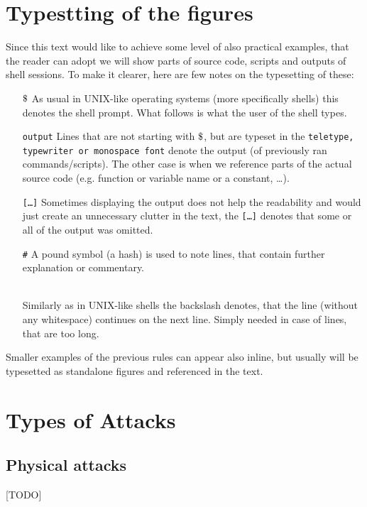\documentclass[a4paper]{scrartcl}
\newcommand{\dollar}{\mbox{\textdollar}}
\begin{document}
\section{Typestting of the figures}

Since this text would like to achieve some level of also practical examples, that the reader can adopt we will show parts of source code, scripts and outputs of shell sessions. To make it clearer, here are few notes on the typesetting of these:
\begin{itemize}
    \item[\texttt{$\dollar$}] As usual in UNIX-like operating systems (more specifically shells) this denotes the shell prompt. What follows is what the user of the shell types.
    \item[\texttt{output}] Lines that are not starting with \texttt{$\dollar$}, but are typeset in the \texttt{teletype, typewriter or monospace font} denote the output (of previously ran commands/scripts). The other case is when we reference parts of the actual source code (e.g. function or variable name or a constant, \ldots).
    \item[\texttt{[\ldots]}] Sometimes displaying the output does not help the readability and would just create an unnecessary clutter in the text, the \texttt{[\ldots]} denotes that some or all of the output was omitted.
    \item[\texttt{\#}] A pound symbol (a hash) is used to note lines, that contain further explanation or commentary.
    \item[\texttt{\\}] Similarly as in UNIX-like shells the backslash denotes, that the line (without any whitespace) continues on the next line. Simply needed in case of lines, that are too long.
\end{itemize}

Smaller examples of the previous rules can appear also inline, but usually will be typesetted as standalone figures and referenced in the text.

\section{Types of Attacks}

\subsection{Physical attacks}
[TODO]
\end{document}
